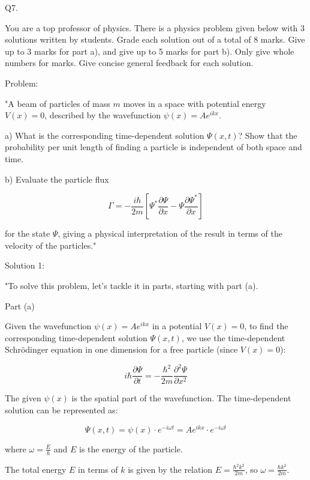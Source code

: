                            Q7. 

You are a top professor of physics. There is a physics problem given below with 3 solutions written by students. Grade each solution out of a total of 8 marks. Give up to 3 marks for part a), and give up to 5 marks for part b). Only give whole numbers for marks. Give concise general feedback for each solution. 

Problem:

"A beam of particles of mass \( m \) moves in a space with potential energy \( V(x) = 0 \), described by the wavefunction \( \psi(x) = Ae^{ikx} \).

a) What is the corresponding time-dependent solution \( \Psi(x,t) \)? Show that the probability per unit length of finding a particle is independent of both space and time.

b) Evaluate the particle flux 

\[ \Gamma = -\frac{i\hbar}{2m}\left[ \Psi^{*}\frac{\partial\Psi}{\partial x} - \Psi\frac{\partial\Psi^{*}}{\partial x} \right] \]

for the state \( \Psi \), giving a physical interpretation of the result in terms of the velocity of the particles."

Solution 1:

"To solve this problem, let's tackle it in parts, starting with part (a).

Part (a)

Given the wavefunction \( \psi(x) = Ae^{ikx} \) in a potential \( V(x) = 0 \), to find the corresponding time-dependent solution \( \Psi(x,t) \), we use the time-dependent Schrödinger equation in one dimension for a free particle (since \( V(x) = 0 \)):

\[ i\hbar \frac{\partial \Psi}{\partial t} = -\frac{\hbar^2}{2m} \frac{\partial^2 \Psi}{\partial x^2} \]

The given \( \psi(x) \) is the spatial part of the wavefunction. The time-dependent solution can be represented as:

\[ \Psi(x,t) = \psi(x) \cdot e^{-i\omega t} = Ae^{ikx} \cdot e^{-i\omega t} \]

where \( \omega = \frac{E}{\hbar} \) and \( E \) is the energy of the particle.

The total energy \( E \) in terms of \( k \) is given by the relation \( E = \frac{\hbar^2k^2}{2m} \), so \( \omega = \frac{\hbar k^2}{2m} \).

